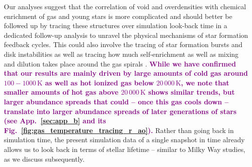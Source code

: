 \documentclass[twocolumn,apj,numberedappendix,appendixfloats,twocolappendix]{openjournal}
\newcommand{\adjusted}[1]{\textbf{\textcolor{purple}{#1}}}
\begin{document}
\begin{CJK*}{UTF8}{gbsn}
Our analyses suggest that the correlation of void and overdensities with chemical enrichment of gas and young stars is more complicated and should better be followed up by tracing these structures over simulation look-back time in a dedicated follow-up analysis to unravel the physical mechanisms of star formation feedback cycles. This could also involve the tracing of star formation bursts and disk instabilities \citep{Sanchez2014, SanchezBlazquez2014, Ho2015} as well as tracing how much self-enrichment as well as mixing and dilution takes place around the gas spirals \citep{Ho2017c}. \adjusted{While we have confirmed that our results are mainly driven by large amounts of cold gas around $100-1000\,\mathrm{K}$ as well as hot ionized gas below $20\,000\,\mathrm{K}$, we note that smaller amounts of hot gas above $20\,000\,\mathrm{K}$ shows similar trends, but larger abundance spreads that could -- once this gas cools down -- translate into larger abundance spreads of later generations of stars (see App.~\ref{sec:app_b} and its Fig.~\ref{fig:gas_temperature_tracing_r_ao}).} Rather than going back in simulation time, the present simulation data of a single snapshot in time already allows us to look back in terms of stellar lifetime -- similar to Milky Way studies, as we discuss subsequently.


\end{CJK*}
\end{document}
